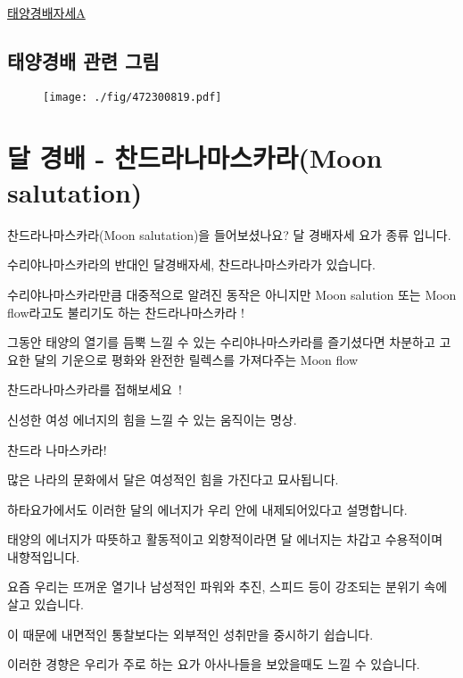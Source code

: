\documentclass[12pt, a4paper, oneside]{book}
\let\stdsection\section
\renewcommand\section{\newpage\stdsection}
\begin{document}
			\href{https://www.youtube.com/watch?v=CL3czAIUDFY}{태양경배자세A}


		\clearpage
			\subsection{태양경배 관련 그림}

			\begin{figure}
			\centering
			\texttt{[image: ./fig/472300819.pdf]}
			\end{figure}
			\clearpage



%
	\section{달 경배 - 찬드라나마스카라(Moon salutation)}



찬드라나마스카라(Moon salutation)을 들어보셨나요?  달 경배자세 요가 종류 입니다.

수리야나마스카라의 반대인 달경배자세, 찬드라나마스카라가 있습니다.

수리야나마스카라만큼 대중적으로 알려진 동작은 아니지만 Moon salution 또는 Moon flow라고도 불리기도 하는 찬드라나마스카라 !

그동안 태양의 열기를 듬뿍 느낄 수 있는 수리야나마스카라를 즐기셨다면 차분하고 고요한 달의 기운으로 평화와 완전한 릴렉스를 가져다주는 Moon flow ~

찬드라나마스카라를 접해보세요~!

신성한 여성 에너지의 힘을 느낄 수 있는 움직이는 명상.

찬드라 나마스카라!

많은 나라의 문화에서 달은 여성적인 힘을 가진다고 묘사됩니다.

하타요가에서도 이러한 달의 에너지가 우리 안에 내제되어있다고 설명합니다.

태양의 에너지가 따뜻하고 활동적이고 외향적이라면 달 에너지는 차갑고 수용적이며 내향적입니다.

요즘 우리는 뜨꺼운 열기나 남성적인 파워와 추진, 스피드 등이 강조되는 분위기 속에 살고 있습니다.

이 때문에 내면적인 통찰보다는 외부적인 성취만을 중시하기 쉽습니다.

이러한 경향은 우리가 주로 하는 요가 아사나들을 보았을때도 느낄 수 있습니다.
\end{document}
